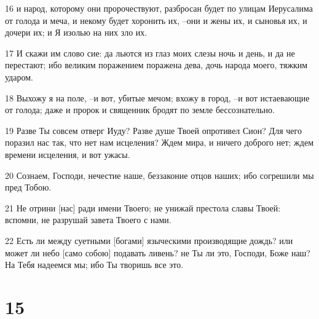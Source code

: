\par 16 и народ, которому они пророчествуют, разбросан будет по улицам Иерусалима от голода и меча, и некому будет хоронить их, --они и жены их, и сыновья их, и дочери их; и Я изолью на них зло их.
\par 17 И скажи им слово сие: да льются из глаз моих слезы ночь и день, и да не перестают; ибо великим поражением поражена дева, дочь народа моего, тяжким ударом.
\par 18 Выхожу я на поле, --и вот, убитые мечом; вхожу в город, --и вот истаевающие от голода; даже и пророк и священник бродят по земле бессознательно.
\par 19 Разве Ты совсем отверг Иуду? Разве душе Твоей опротивел Сион? Для чего поразил нас так, что нет нам исцеления? Ждем мира, и ничего доброго нет; ждем времени исцеления, и вот ужасы.
\par 20 Сознаем, Господи, нечестие наше, беззаконие отцов наших; ибо согрешили мы пред Тобою.
\par 21 Не отрини [нас] ради имени Твоего; не унижай престола славы Твоей: вспомни, не разрушай завета Твоего с нами.
\par 22 Есть ли между суетными [богами] языческими производящие дождь? или может ли небо [само собою] подавать ливень? не Ты ли это, Господи, Боже наш? На Тебя надеемся мы; ибо Ты творишь все это.

\chapter{15}

